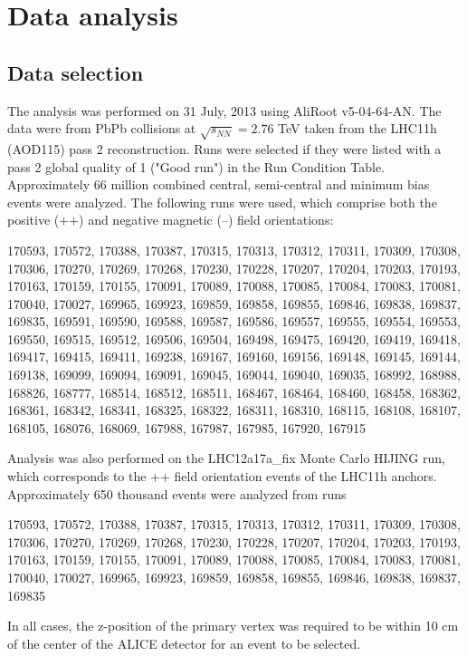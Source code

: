 \section{Data analysis}
\subsection{Data selection}
\label{sec:DataSelection}
The analysis was performed on 31 July, 2013 using AliRoot v5-04-64-AN. The data were from PbPb collisions at $\sqrt{s_{NN}}=2.76$  TeV taken from the LHC11h (AOD115) pass 2 reconstruction. 
Runs were selected if they were listed with a pass 2 global quality of 1 ("Good run") in the Run Condition Table. 
Approximately 66 million combined central, semi-central and minimum bias events were analyzed. 
The following runs were used, which comprise both the positive (++) and negative magnetic (--) field orientations:

170593, 170572, 170388, 170387, 170315, 170313, 170312, 170311, 170309, 170308, 170306, 170270, 170269, 170268, 170230, 170228, 170207, 170204, 170203, 170193, 170163, 170159, 170155, 170091, 170089, 170088, 170085, 170084, 170083, 170081, 170040, 170027, 169965, 169923, 169859, 169858, 169855, 169846, 169838, 169837, 169835, 169591, 169590, 169588, 169587, 169586, 169557, 169555, 169554, 169553, 169550, 169515, 169512, 169506, 169504, 169498, 169475, 169420, 169419, 169418, 169417, 169415, 169411, 169238, 169167, 169160, 169156, 169148, 169145, 169144, 169138, 169099, 169094, 169091, 169045, 169044, 169040, 169035, 168992, 168988, 168826, 168777, 168514, 168512, 168511, 168467, 168464, 168460, 168458, 168362, 168361, 168342, 168341, 168325, 168322, 168311, 168310, 168115, 168108, 168107, 168105, 168076, 168069, 167988, 167987, 167985, 167920, 167915

Analysis was also performed on the LHC12a17a\_fix Monte Carlo HIJING run, which corresponds to the ++ field orientation events of the LHC11h anchors.  
Approximately 650 thousand events were analyzed from runs

170593, 170572, 170388, 170387, 170315, 170313, 170312, 170311, 170309, 170308, 170306, 170270, 170269, 170268, 170230, 170228, 170207, 170204, 170203, 170193, 170163, 170159, 170155, 170091, 170089, 170088, 170085, 170084, 170083, 170081, 170040, 170027, 169965, 169923, 169859, 169858, 169855, 169846, 169838, 169837, 169835

In all cases, the z-position of the primary vertex was required to be within 10 cm of the center of the ALICE detector for an event to be selected.  


